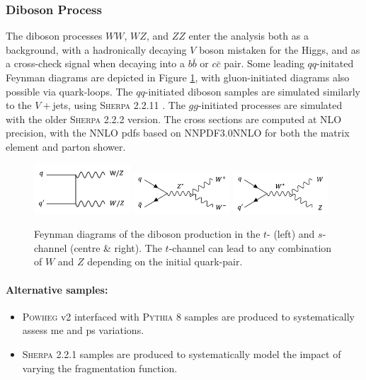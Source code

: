 \subsubsection{Diboson Process}
The diboson processes $WW$, $WZ$, and $ZZ$ enter the analysis both as a background, with a hadronically decaying $V$ boson mistaken for the Higgs, and as a cross-check signal when decaying into a $b\bar{b}$ or $c\bar{c}$ pair. Some leading $qq$-initated Feynman diagrams are depicted in Figure \ref{fig:feyndiV}, with gluon-initiated diagrams also possible via quark-loops. The $qq$-initiated diboson samples are simulated similarly to the $V+$jets, using \textsc{Sherpa} 2.2.11 \cite{10.21468/SciPostPhys.7.3.034}. The $gg$-initiated processes are simulated with the older \textsc{Sherpa} 2.2.2 version. The cross sections are computed at NLO precision, with the NNLO \glspl{pdf} based on NNPDF3.0NNLO \cite{PDFLHCrun2} for both the matrix element and parton shower.
\begin{figure}[h!]
  \center
  \includegraphics[width=0.32\textwidth]{Images/VH/Feynman/diboson.png}
  \includegraphics[width=0.32\textwidth]{Images/VH/Feynman/diW.png}
  \includegraphics[width=0.32\textwidth]{Images/VH/Feynman/diWZ.png}
  \caption{Feynman diagrams of the diboson production in the $t$- (left) and $s$-channel (centre \& right). The $t$-channel can lead to any combination of $W$ and $Z$ depending on the initial quark-pair.}
  \label{fig:feyndiV}
\end{figure}

\paragraph{Alternative samples:}
\begin{itemize}
  \item \textsc{Powheg} v2 interfaced with \textsc{Pythia} 8 samples are produced to systematically assess \gls{me} and \gls{ps} variations. 
  \item \textsc{Sherpa} 2.2.1 samples are produced to systematically model the impact of varying the fragmentation function. 
\end{itemize}

